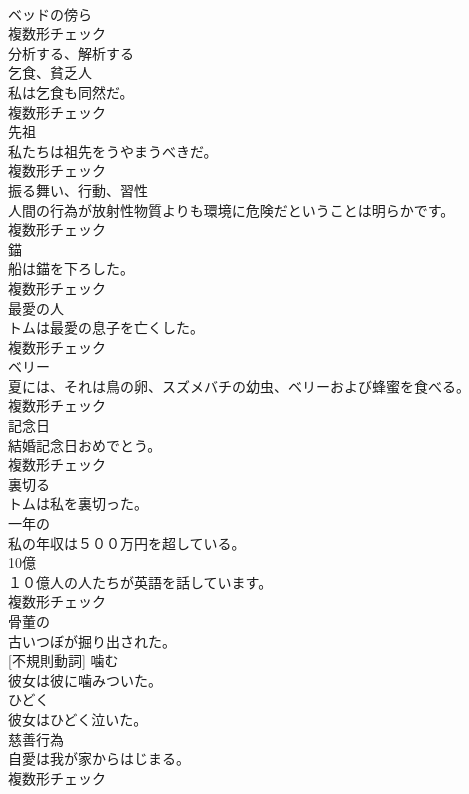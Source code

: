 \documentclass[8pt]{extreport}
\begin{document}
\begin{CJK}{UTF8}{min}
\\	[名詞]	ベッドの傍ら	
\\	複数形チェック
\\	[動詞]	分析する、解析する	
\\	[名詞]	乞食、貧乏人	
\\	私は乞食も同然だ。	
\\	複数形チェック
\\	[名詞]	先祖	
\\	私たちは祖先をうやまうべきだ。	
\\	複数形チェック
\\	[名詞]	振る舞い、行動、習性	
\\	人間の行為が放射性物質よりも環境に危険だということは明らかです。	
\\	複数形チェック
\\	[名詞]	錨	
\\	船は錨を下ろした。	
\\	複数形チェック
\\	[名詞]	最愛の人	
\\	トムは最愛の息子を亡くした。	
\\	複数形チェック
\\	[名詞]	ベリー	
\\	夏には、それは鳥の卵、スズメバチの幼虫、ベリーおよび蜂蜜を食べる。	
\\	複数形チェック
\\	[名詞]	記念日	
\\	結婚記念日おめでとう。	
\\	複数形チェック
\\	[動詞]	裏切る	
\\	トムは私を裏切った。	
\\	[形容詞]	一年の	
\\	私の年収は５００万円を超している。	
\\	[名詞]	10億	
\\	１０億人の人たちが英語を話しています。	
\\	複数形チェック
\\	[形容詞]	骨董の	
\\	古いつぼが掘り出された。	
\\	[動詞] [不規則動詞]	噛む	
\\	彼女は彼に噛みついた。	
\\	[副詞]	ひどく	
\\	彼女はひどく泣いた。	
\\	[名詞]	慈善行為	
\\	自愛は我が家からはじまる。	
\\	複数形チェック

\end{CJK}
\end{document}
